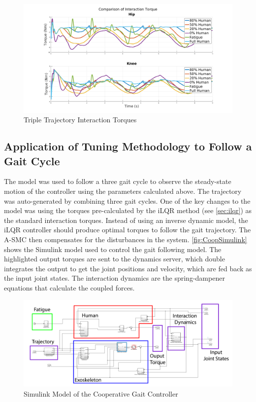 \begin{figure}
    \centering
    \includegraphics[width=\columnwidth]{images/controllers/trajs/interactions.png}
    \caption[Triple Trajectory Interaction Torques]{Triple Trajectory Interaction Torques}
    \label{fig:InteractionTripleTraj}
\end{figure}


\subsection{Application of Tuning Methodology to Follow a Gait Cycle}


The model was used to follow a three gait cycle to observe the steady-state motion of the controller using the parameters calculated above. The trajectory was auto-generated by combining three gait cycles.  One of the key changes to the model was using the torques pre-calculated by the iLQR method (see \autoref{sec:ilqr}) as the standard interaction torques.  Instead of using an inverse dynamic model, the iLQR controller should produce optimal torques to follow the gait trajectory. The A-SMC then compensates for the disturbances in the system. \autoref{fig:CoopSimulink} shows the Simulink model used to control the gait following model. The highlighted output torques are sent to the dynamics server, which double integrates the output to get the joint positions and velocity, which are fed back as the input joint states. The interaction dynamics are the spring-dampener equations that calculate the coupled forces.  



\begin{figure}[h!]
    \centering
    \includegraphics[width=\columnwidth]{images/controllers/upper_model_simulink_edit.png}
    \caption[Simulink Model Cooperative Controller]{Simulink Model of the Cooperative Gait Controller }
    \label{fig:CoopSimulink}
\end{figure}


